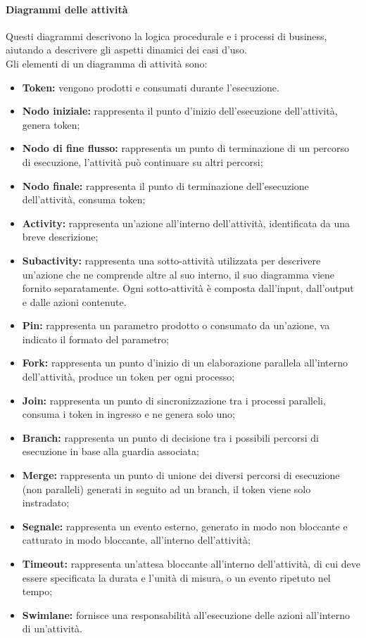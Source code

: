 \paragraph*{Diagrammi delle attività}
Questi diagrammi descrivono la logica procedurale e i processi di business, aiutando a descrivere gli aspetti dinamici dei casi d'uso. \\
Gli elementi di un diagramma di attività sono:
\begin{itemize}
	\item \textbf{Token:} vengono prodotti e consumati durante l'esecuzione.
	\item \textbf{Nodo iniziale:} rappresenta il punto d'inizio dell'esecuzione dell'attività, genera token;
	\item \textbf{Nodo di fine flusso:} rappresenta un punto di terminazione di un percorso di esecuzione, l'attività può continuare su altri percorsi;
	\item \textbf{Nodo finale:} rappresenta il punto di terminazione dell'esecuzione dell'attività, consuma token;
	\item \textbf{Activity:} rappresenta un'azione all'interno dell'attività, identificata da una breve descrizione;
	\item \textbf{Subactivity:} rappresenta una sotto-attività utilizzata per descrivere un'azione che ne comprende altre al suo interno, il suo diagramma viene fornito separatamente. Ogni sotto-attività è composta dall'input, dall'output e dalle azioni contenute.
	\item \textbf{Pin:} rappresenta un parametro prodotto o consumato da un'azione, va indicato il formato del parametro;
	\item \textbf{Fork:} rappresenta un punto d'inizio di un elaborazione parallela all'interno dell'attività, produce un token per ogni processo;
	\item \textbf{Join:} rappresenta un punto di sincronizzazione tra i processi paralleli, consuma i token in ingresso e ne genera solo uno;
	\item \textbf{Branch:} rappresenta un punto di decisione tra i possibili percorsi di esecuzione in base alla guardia associata;
	\item \textbf{Merge:} rappresenta un punto di unione dei diversi percorsi di esecuzione (non paralleli) generati in seguito ad un branch, il token viene solo instradato;
	\item \textbf{Segnale:} rappresenta un evento esterno, generato in modo non bloccante e catturato in modo bloccante, all'interno dell'attività;
	\item \textbf{Timeout:} rappresenta un'attesa bloccante all'interno dell'attività, di cui deve essere specificata la durata e l'unità di misura, o un evento ripetuto nel tempo;
	\item \textbf{Swimlane:} fornisce una responsabilità all'esecuzione delle azioni all'interno di un'attività.
\end{itemize}

